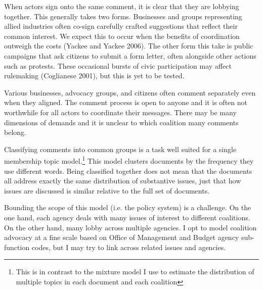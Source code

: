 When actors sign onto the same comment, it is clear that they are lobbying together. This generally takes two forms. Businesses and groups representing allied industries often co-sign carefully crafted suggestions that reflect their common interest. We expect this to occur when the benefits of coordination outweigh the costs (Yackee and Yackee 2006). The other form this take is public campaigns that ask citizens to submit a form letter, often alongside other actions such as protests. These occasional bursts of civic participation may affect rulemaking (Coglianese 2001), but this is yet to be tested. %

Various businesses, advocacy groups, and citizens often comment separately even when they aligned. The comment process is open to anyone and it is often not worthwhile for all actors to coordinate their messages. There may be many dimensions of demands and it is unclear to which coalition many comments belong.

Classifying comments into common groups is a task well suited for a single membership topic model.\footnote{This is in contrast to the mixture model I use to estimate the distribution of multiple topics in each document and each coalition} This model clusters documents by the frequency they use different words. Being classified together does not mean that the documents all address exactly the same distribution of substantive issues, just that how issues are discussed is similar relative to the full set of documents.


Bounding the scope of this model (i.e. the policy system) is a challenge. On the one hand, each agency deals with many issues of interest to different coalitions. On the other hand, many lobby across multiple agencies. I opt to model coalition advocacy at a fine scale based on Office of Management and Budget agency sub-function codes, but I may try to link across related issues and agencies. 